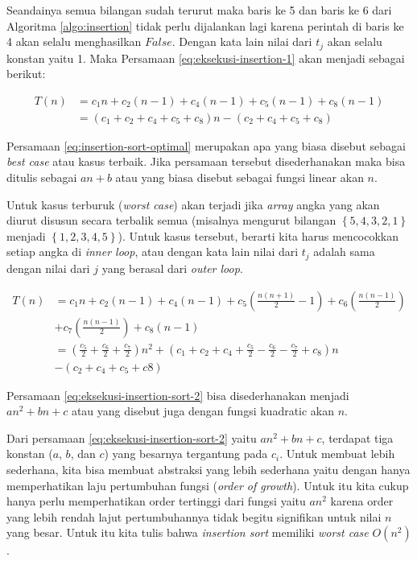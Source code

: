 Seandainya semua bilangan sudah terurut maka baris ke 5 dan baris ke 6 dari Algoritma \ref{algo:insertion} tidak perlu dijalankan lagi karena perintah di baris ke 4 akan selalu menghasilkan $False$. Dengan kata lain nilai dari $t_{j}$ akan selalu konstan yaitu 1. Maka Persamaan \ref{eq:eksekusi-insertion-1} akan menjadi sebagai berikut:

\begin{equation}\label{eq:insertion-sort-optimal}
    \begin{aligned}
        T(n) & = c_{1}n + c_2(n-1)+c_4(n-1)+c_5(n-1)+c_8(n-1) \\
             & = (c_1+c_2+c_4+c_5+c_8)n-(c_2+c_4+c_5+c_8)
    \end{aligned}
\end{equation}

Persamaan \ref{eq:insertion-sort-optimal} merupakan apa yang biasa disebut sebagai \textit{best case} atau kasus terbaik. Jika persamaan tersebut disederhanakan maka bisa ditulis sebagai $an+b$ atau yang biasa disebut sebagai fungsi linear akan $n$. 

Untuk kasus terburuk (\textit{worst case}) akan terjadi jika \textit{array} angka yang akan diurut disusun secara terbalik semua (misalnya mengurut bilangan $\left\{5,4,3,2,1\right\}$ menjadi $\left\{1,2,3,4,5\right\}$). Untuk kasus tersebut, berarti kita harus mencocokkan setiap angka di \textit{inner loop}, atau dengan kata lain nilai dari $t_{j}$ adalah sama dengan nilai dari $j$ yang berasal dari \textit{outer loop}. 

\begin{equation}\label{eq:eksekusi-insertion-sort-2}
    \begin{aligned}
        T(n) & = c_1n + c_2(n-1) + c_4(n-1) + c_5(\frac{n(n+1)}{2}-1) + c_6(\frac{n(n-1)}{2}) \\ 
             &   + c_7(\frac{n(n-1)}{2})+c_8(n-1) \\
             & = (\frac{c_5}{2}+\frac{c_6}{2}+\frac{c_7}{2})n^2+(c_1+c_2+c_4+\frac{c_5}{2}-\frac{c_6}{2}-\frac{c_7}{2}+c_8)n \\
             &   -(c_2+c_4+c_5+c8)
    \end{aligned}
\end{equation}

Persamaan \ref{eq:eksekusi-insertion-sort-2} bisa disederhanakan menjadi $an^2+bn+c$ atau yang disebut juga dengan fungsi kuadratic akan $n$. 

Dari persamaan \ref{eq:eksekusi-insertion-sort-2} yaitu $an^2+bn+c$, terdapat tiga konstan ($a$, $b$, dan $c$) yang besarnya tergantung pada $c_i$. Untuk membuat lebih sederhana, kita bisa membuat abstraksi yang lebih sederhana yaitu dengan hanya memperhatikan laju pertumbuhan fungsi (\textit{order of growth}). Untuk itu kita cukup hanya perlu memperhatikan order tertinggi dari fungsi yaitu $an^2$ karena order yang lebih rendah lajut pertumbuhannya tidak begitu signifikan untuk nilai $n$ yang besar. Untuk itu kita tulis bahwa \textit{insertion sort} memiliki \textit{worst case} $O(n^2)$.

